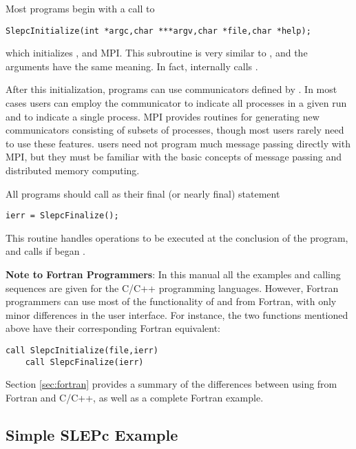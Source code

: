 	Most \slepc programs begin with a call to 
	\begin{Verbatim}[fontsize=\small]
	SlepcInitialize(int *argc,char ***argv,char *file,char *help);
	\end{Verbatim}
which initializes \slepc, \petsc and MPI. This subroutine is very similar to , and the arguments have the same meaning. In fact, internally  calls .

	After this initialization, \slepc programs can use communicators defined by \petsc. In most cases users can employ the communicator  to indicate all processes in a given run and  to indicate a single process. MPI provides routines for generating new communicators consisting of subsets of processes, though most users rarely need to use these features. \slepc users need not program much message passing directly with MPI, but they must be familiar with the basic concepts of message passing and distributed memory computing.

	All \slepc programs should call  as their final (or nearly final) statement
	\begin{Verbatim}[fontsize=\small]
	ierr = SlepcFinalize();
	\end{Verbatim}
This routine handles operations to be executed at the conclusion of the program, and calls  if  began \petsc.

\medskip
\textbf{Note to Fortran Programmers}: In this manual all the examples and calling sequences are given for the C/C++ programming languages. However, Fortran programmers can use most of the functionality of \slepc and \petsc from Fortran, with only minor differences in the user interface. For instance, the two functions mentioned above have their corresponding Fortran equivalent:
	\begin{Verbatim}[fontsize=\small]
	call SlepcInitialize(file,ierr)
	call SlepcFinalize(ierr)
	\end{Verbatim}
Section \ref{sec:fortran} provides a summary of the differences between using \slepc from Fortran and C/C++, as well as a complete Fortran example. 

\subsection{Simple SLEPc Example}
\label{sec:simpleex}

